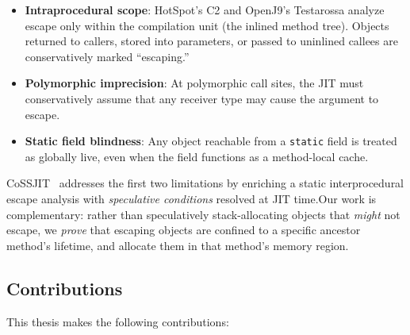 \documentclass[12pt,a4paper]{article}
\begin{document}
\begin{itemize}
  \item \textbf{Intraprocedural scope}: HotSpot's C2 and OpenJ9's Testarossa analyze escape only within the compilation unit (the inlined method tree). Objects returned to callers, stored into parameters, or passed to uninlined callees are conservatively marked ``escaping.''
  \item \textbf{Polymorphic imprecision}: At polymorphic call sites, the JIT must conservatively assume that any receiver type may cause the argument to escape.
  \item \textbf{Static field blindness}: Any object reachable from a \texttt{static} field is treated as globally live, even when the field functions as a method-local cache.
\end{itemize}

CoSSJIT~\cite{cossjit2025} addresses the first two limitations by enriching a static interprocedural escape analysis with \emph{speculative conditions} resolved at JIT time.Our work is complementary: rather than speculatively stack-allocating objects that \emph{might} not escape, we \emph{prove} that escaping objects are confined to a specific ancestor method's lifetime, and allocate them in that method's memory region.

\subsection{Contributions}

This thesis makes the following contributions:
\end{document}
